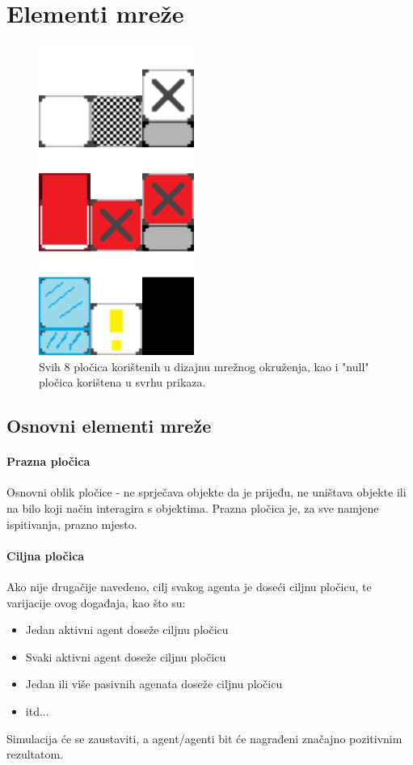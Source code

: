 \documentclass[diplomskirad]{fer}
\begin{document}
\section{Elementi mreže}
\begin{figure}[htb]
\centering
\includegraphics[width=0.5\linewidth]{Figures/grid/alltiles.png}
\caption{Svih 8 pločica korištenih u dizajnu mrežnog okruženja, kao i "null" pločica korištena u svrhu prikaza.}
\label{slk:alltiles}
\end{figure}
\subsection{Osnovni elementi mreže}

\paragraph{Prazna pločica}
Osnovni oblik pločice - ne sprječava objekte da je prijeđu, ne uništava objekte ili na bilo koji način interagira s objektima. Prazna pločica je, za sve namjene ispitivanja, prazno mjesto.

\paragraph{Ciljna pločica}
Ako nije drugačije navedeno, cilj svakog agenta je doseći ciljnu pločicu, te varijacije ovog događaja, kao što su:
\begin{itemize}
    \item Jedan aktivni agent doseže ciljnu pločicu
    \item Svaki aktivni agent doseže ciljnu pločicu
    \item Jedan ili više pasivnih agenata doseže ciljnu pločicu
    \item itd...
\end{itemize}
Simulacija će se zaustaviti, a agent/agenti bit će nagrađeni značajno pozitivnim rezultatom.
\end{document}
